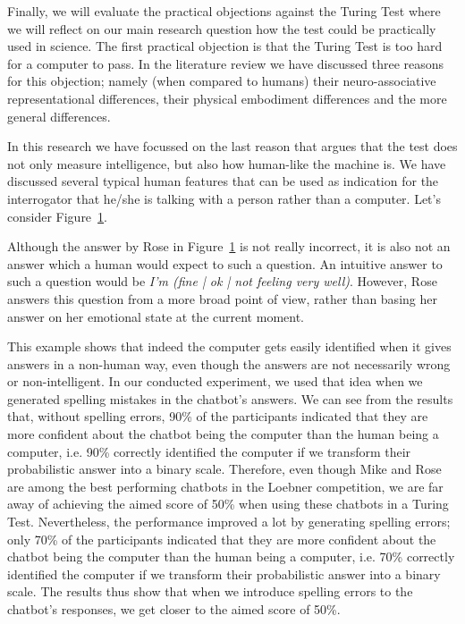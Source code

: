 Finally, we will evaluate the practical objections against the Turing Test where we will reflect on our main research question how the test could be practically used in science. The first practical objection is that the Turing Test is too hard for a computer to pass. In the literature review we have discussed three reasons for this objection; namely (when compared to humans) their neuro-associative representational differences, their physical embodiment differences and the more general differences.

In this research we have focussed on the last reason that argues that the test does not only measure intelligence, but also how human-like the machine is. We have discussed several typical human features that can be used as indication for the interrogator that he/she is talking with a person rather than a computer. Let's consider Figure~\ref{Example3}.

\begin{figure}[ht]
   \begin{center}
   \end{center}
   \caption{}
   \label{Example3}
\end{figure}

Although the answer by Rose in Figure~\ref{Example3} is not really incorrect, it is also not an answer which a human would expect to such a question. An intuitive answer to such a question would be \textit{I'm (fine | ok | not feeling very well)}. However, Rose answers this question from a more broad point of view, rather than basing her answer on her emotional state at the current moment.

This example shows that indeed the computer gets easily identified when it gives answers in a non-human way, even though the answers are not necessarily wrong or non-intelligent. In our conducted experiment, we used that idea when we generated spelling mistakes in the chatbot’s answers. We can see from the results that, without spelling errors, 90\% of the participants indicated that they are more confident about the chatbot being the computer than the human being a computer, i.e. 90\% correctly identified the computer if we transform their probabilistic answer into a binary scale. Therefore, even though Mike and Rose are among the best performing chatbots in the Loebner competition, we are far away of achieving the aimed score of 50\% when using these chatbots in a Turing Test. Nevertheless, the performance improved a lot by generating spelling errors; only 70\% of the participants  indicated that they are more confident about the chatbot being the computer than the human being a computer, i.e. 70\% correctly identified the computer if we transform their probabilistic answer into a binary scale. The results thus show that when we introduce spelling errors to the chatbot’s responses, we get closer to the aimed score of 50\%.

